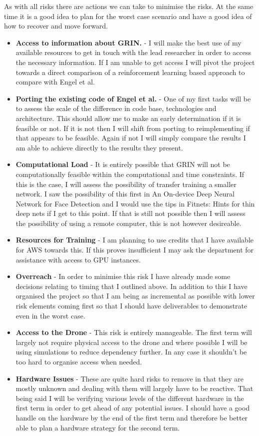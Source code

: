 \documentclass[]{../resources/final_report}
\begin{document}
As with all risks there are actions we can take to minimise the risks. At the same time it is a good idea to plan for the worst case scenario and have a good idea of how to recover and move forward.

\begin{itemize}
  \item \textbf{Access to information about GRIN.} - I will make the best use of my available resources to get in touch with the lead researcher in order to access the necessary information. If I am unable to get access I will pivot the project towards a direct comparison of a reinforcement learning based approach to compare with Engel et al.
  \item \textbf{Porting the existing code of Engel et al.} - One of my first tasks will be to assess the scale of the difference in code base, technologies and architecture. This should allow me to make an early determination if it is feasible or not. If it is not then I will shift from porting to reimplementing if that appears to be feasible. Again if not I will simply compare the results I am able to achieve directly to the results they present.
  \item \textbf{Computational Load} - It is entirely possible that GRIN will not be computationally feasible within the computational and time constraints. If this is the case, I will assess the possibility of transfer training a smaller network. I saw the possibility of this first in An On-device Deep Neural Network for Face Detection \cite{apple_machine_learning_journal_2017} and I would use the tips in Fitnets: Hints for thin deep nets \cite{Romero15fitnets:hints} if I get to this point. If that is still not possible then I will assess the possibility of using a remote computer, this is not however desireable.
  \item \textbf{Resources for Training} - I am planning  to use credits that I have available for AWS towards this. If this proves insufficient I may ask the department for assistance with access to GPU instances.
  \item \textbf{Overreach} - In order to minimise this risk I have already made some decisions relating to timing that I outlined above. In addition to this I have organised the project so that I am being as incremental as possible with lower risk elements coming first so that I should have deliverables to demonstrate even in the worst case. 
  \item \textbf{Access to the Drone} - This risk is entirely manageable. The first term will largely not require physical access to the drone and where possible I will be using simulations to reduce dependency further. In any case it shouldn't be too hard to organise access when needed.
  \item \textbf{Hardware Issues} - These are quite hard risks to remove in that they are mostly unknown and dealing with them will largely have to be reactive. That being said I will be verifying various levels of the different hardware in the first term in order to get ahead of any potential issues. I should have a good handle on the hardware by the end of the first term and therefore be better able to plan a hardware strategy for the second term.
\end{itemize}

%
\newpage



\label{endpage}
\end{document}
